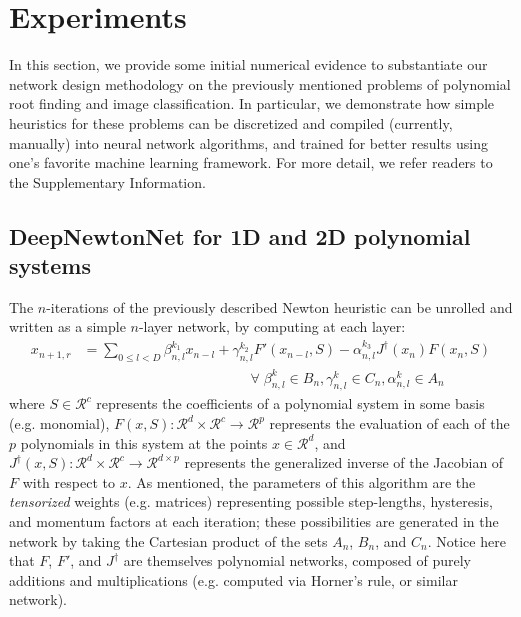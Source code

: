 \documentclass{article}
\DeclareMathOperator*{\argmin}{arg\,min}
\begin{document}

\section{Experiments}
In this section, we provide some initial numerical evidence to substantiate our network design methodology on the previously mentioned problems of polynomial root finding and image classification. In particular, we demonstrate how simple heuristics for these problems can be discretized and compiled (currently, manually) into neural network algorithms, and trained for better results using one's favorite machine learning framework. For more detail, we refer readers to the Supplementary Information.

\subsection*{DeepNewtonNet for 1D and 2D polynomial systems}
The $n$-iterations of the previously described Newton heuristic can be unrolled and written as a simple $n$-layer network, by computing at each layer:
\begin{align}
    x_{n+1,r} &= \sum_{0 \leq l < D} \beta_{n,l}^{k_1} x_{n-l} + \gamma_{n,l}^{k_2}F'(x_{n-l},S) - \alpha_{n,l}^{k_3} J^{\dagger}(x_n)F(x_n,S) \nonumber \\
    & \qquad\qquad\qquad\qquad\qquad\qquad \forall \; \beta_{n,l}^k \in B_n, \gamma_{n,l}^k \in C_n, \alpha_{n,l}^k \in A_n \nonumber
\end{align}
where $S \in \mathcal{R}^c$ represents the coefficients of a polynomial system in some basis (e.g. monomial), \mbox{$F(x,S):\mathcal{R}^d \times \mathcal{R}^c \rightarrow \mathcal{R}^p$} represents the evaluation of each of the $p$ polynomials in this system at the points $x \in \mathcal{R}^d$, and $J^{\dagger}(x,S):\mathcal{R}^d \times \mathcal{R}^c \rightarrow \mathcal{R}^{d \times p}$ represents the generalized inverse of the Jacobian of $F$ with respect to $x$. As mentioned, the parameters of this algorithm are the \textit{tensorized} weights (e.g. matrices) representing possible step-lengths, hysteresis, and momentum factors at each iteration; these possibilities are generated in the network by taking the Cartesian product of the sets $A_n$, $B_n$, and $C_n$. Notice here that $F$, $F'$, and $J^{\dagger}$ are themselves polynomial networks, composed of purely additions and multiplications (e.g. computed via Horner's rule, or similar network).
\end{document}
